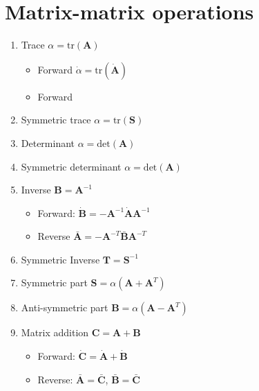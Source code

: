 \documentclass{article}
\begin{document}
\section{Matrix-matrix operations}

\begin{enumerate}
\item Trace $\alpha = \text{tr}(\mathbf{A})$
\begin{itemize}
\item Forward $\dot{\alpha} = \text{tr}(\dot{\mathbf{A}})$
\item Forward 
\end{itemize}

\item Symmetric trace $\alpha = \text{tr}(\mathbf{S})$ 
\item Determinant $\alpha = \text{det}(\mathbf{A})$
\item Symmetric determinant $\alpha = \text{det}(\mathbf{A})$

\item Inverse $\mathbf{B} = \mathbf{A}^{-1}$
\begin{itemize}
\item Forward: $\dot{\mathbf{B}} = - \mathbf{A}^{-1} \dot{\mathbf{A}} \mathbf{A}^{-1}$ 
\item Reverse $\bar{\mathbf{A}} = - \mathbf{A}^{-T} \bar{\mathbf{B}} \mathbf{A}^{-T}$
\end{itemize}

\item Symmetric Inverse $\mathbf{T} = \mathbf{S}^{-1}$

\item Symmetric part $\mathbf{S} = \alpha(\mathbf{A} + \mathbf{A}^{T})$

\item Anti-symmetric part $\mathbf{B} = \alpha (\mathbf{A} - \mathbf{A}^{T})$

\item Matrix addition $\mathbf{C} = \mathbf{A} + \mathbf{B}$
\begin{itemize}
\item Forward: $\dot{\mathbf{C}} =  \dot{\mathbf{A}} + \dot{\mathbf{B}}$
\item Reverse: $\bar{\mathbf{A}} =  \bar{\mathbf{C}}$, $\bar{\mathbf{B}} = \bar{\mathbf{C}}$
\end{itemize}



\end{enumerate}
\end{document}
